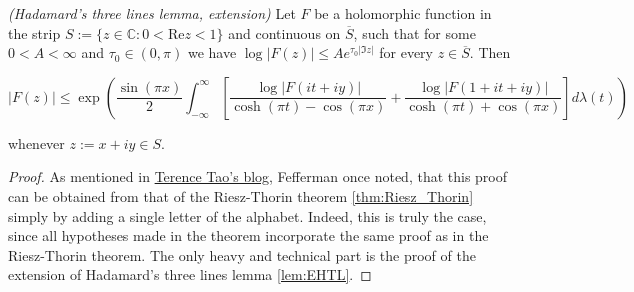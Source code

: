 \begin{mdframed}
	\begin{lemma}\emph{(Hadamard's three lines lemma, extension)}
		Let $F$ be a holomorphic function in the strip $S := \{z \in \mathbb{C}: 0 < \mathrm{Re}z < 1\}$ and continuous on $\overline{S}$, such that for some $0 < A < \infty$ and $\tau_0 \in (0,\pi)$ we have $\log \vert F(z)\vert \leqslant A e^{\tau_0 \vert \Im z \vert}$ for every $z \in \overline{S}$. Then

			\begin{equation*}
				\vert F(z) \vert \leqslant \exp\left( \frac{\sin(\pi x)}{2} \int_{-\infty}^\infty \left[ \frac{\log \vert F(it + iy)\vert}{\cosh(\pi t) - \cos(\pi x)} + \frac{\log \vert F(1 + it + iy)\vert}{\cosh(\pi t) + \cos(\pi x)} \right] d\lambda(t)\right)
			\end{equation*}

			whenever $z := x + iy \in S$.
			\label{lem:EHTL}
	\end{lemma}
\end{mdframed}

\begin{proof}
	As mentioned in \href{https://terrytao.wordpress.com/2011/05/03/steins-interpolation-theorem/}{Terence Tao's blog}, Fefferman once noted, that this proof can be obtained from that of the Riesz-Thorin theorem \ref{thm:Riesz_Thorin} simply by adding a single letter of the alphabet. Indeed, this is truly the case, since all hypotheses made in the theorem incorporate the same proof as in the Riesz-Thorin theorem. The only heavy and technical part is the proof of the extension of Hadamard's three lines lemma \ref{lem:EHTL}.
\end{proof}

